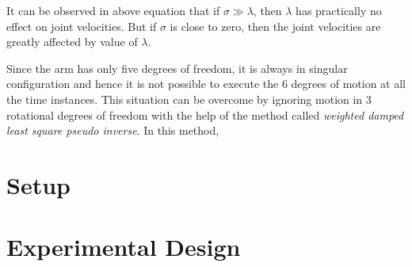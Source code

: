 It can be observed in above equation that if $\sigma \gg \lambda$, then $\lambda$ has practically no effect on joint velocities. But if $\sigma$ is close to zero, then the joint velocities are greatly affected by value of $\lambda$.  

Since the arm has only five degrees of freedom, it is always in singular configuration and hence it is not possible to execute the 6 degrees of motion at all the time instances. This situation can be overcome by ignoring motion in 3 rotational degrees of freedom with the help of the method called \textit{weighted damped least square pseudo inverse}. In this method, 	
\section{Setup}


\section{Experimental Design}

